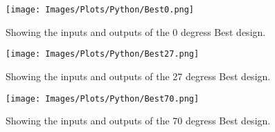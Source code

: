 \begin{figure}[htb] 
    \centering
    \texttt{[image: Images/Plots/Python/Best0.png]} 
    \caption{Showing the inputs and outputs of the 0 degress Best design.} 
    \label{fig:python0Best} 
\end{figure}
\begin{figure}[htb] 
    \centering
    \texttt{[image: Images/Plots/Python/Best27.png]} 
    \caption{Showing the inputs and outputs of the 27 degress Best design.} 
    \label{fig:python27Best} 
\end{figure}
\begin{figure}[htb] 
    \centering
    \texttt{[image: Images/Plots/Python/Best70.png]} 
    \caption{Showing the inputs and outputs of the 70 degress Best design.} 
    \label{fig:python70Best} 
\end{figure}
